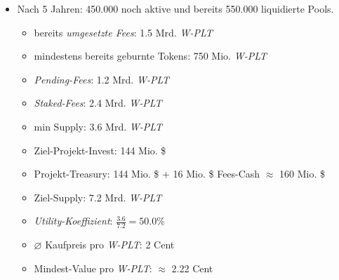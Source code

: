 \begin{Example}
\begin{itemize}
\begin{itemize}
	\end{itemize}
	\item Nach 5 Jahren: 450.000 noch aktive und bereits 550.000 liquidierte Pools.
	\begin{itemize}
		\item bereits \textit{umgesetzte Fees}: 1.5 Mrd. \textit{W-PLT} 
		\item mindestens bereits geburnte Tokens: 750 Mio. \textit{W-PLT}
		\item \textit{Pending-Fees}: 1.2 Mrd. \textit{W-PLT}
		\item \textit{Staked-Fees}: 2.4 Mrd. \textit{W-PLT} 
		\item min Supply: 3.6 Mrd. \textit{W-PLT} 
		\item Ziel-Projekt-Invest: 144 Mio. \$
		\item Projekt-Treasury: 144 Mio. \$ + 16 Mio. \$ Fees-Cash $\approx$ 160 Mio. \$
		\item Ziel-Supply: 7.2 Mrd. \textit{W-PLT}
		\item \textit{Utility-Koeffizient}: $\frac{3.6}{7.2} = 50.0 \%$
		\item $\varnothing$ Kaufpreis pro \textit{W-PLT}: 2 Cent
		\item Mindest-Value pro \textit{W-PLT}: $\approx$ 2.22 Cent		
	\end{itemize}	 
\end{itemize}

\end{Example}

\vspace{1.0cm}


